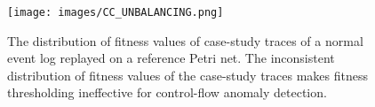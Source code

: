 \begin{figure}[!t]
\centering
\texttt{[image: images/CC\_UNBALANCING.png]}
\caption{The distribution of fitness values of case-study traces of a normal event log replayed on a reference Petri net. The inconsistent distribution of fitness values of the case-study traces makes fitness thresholding ineffective for control-flow anomaly detection.}
\label{CC_UNBALANCING}
\end{figure}